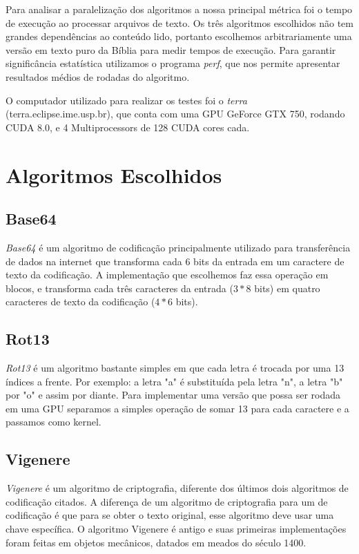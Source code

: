 \documentclass[12pt]{article}
\begin{document}
Para analisar a paralelização dos algoritmos a nossa principal métrica
foi o tempo de execução ao processar arquivos de texto. Os três 
algoritmos escolhidos não tem grandes dependências ao conteúdo lido, 
portanto escolhemos arbitrariamente uma versão em texto puro da Bíblia
para medir tempos de execução. Para garantir significância estatística
utilizamos o programa \emph{perf}, que nos permite apresentar resultados
médios de rodadas do algoritmo.

O computador utilizado para realizar os testes foi o \emph{terra} 
(terra.eclipse.ime.usp.br), que conta com uma GPU GeForce GTX 750,
rodando CUDA 8.0, e 4 Multiprocessors de 128 CUDA cores cada. 


\newpage
\section{Algoritmos Escolhidos}
\subsection{Base64}
\emph{Base64} é um algoritmo de codificação principalmente utilizado 
para transferência de dados na internet que transforma cada 6 bits 
da entrada em um caractere de texto da codificação. A implementação que 
escolhemos faz essa operação em blocos, e transforma cada três
caracteres da entrada ($3 * 8$ bits) em quatro caracteres de texto da
codificação ($4 * 6$ bits).

\subsection{Rot13}
\emph{Rot13} é um algoritmo bastante simples em que cada letra é
trocada por uma 13 índices a frente. Por exemplo: a letra "a" é
substituída pela letra "n", a letra "b" por "o" e assim por diante.
Para implementar uma versão que possa ser rodada em uma GPU separamos
a simples operação de somar 13 para cada caractere e a passamos como
kernel. 

\subsection{Vigenere}
\emph{Vigenere} é um algoritmo de criptografia, diferente dos últimos 
dois algoritmos de codificação citados. A diferença de um algoritmo de
criptografia para um de codificação é que para se obter o texto 
original, esse algoritmo deve usar uma chave específica. O algoritmo
Vigenere é antigo e suas primeiras implementações foram feitas em 
objetos mecânicos, datados em meados do século 1400.
\end{document}
